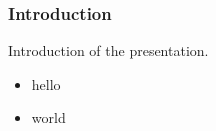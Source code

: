 \begin{frame}
	\frametitle{Introduction}
	
	Introduction of the presentation.
	
	\begin{itemize}
		\item hello
		\item world
	\end{itemize}
	
\end{frame}

